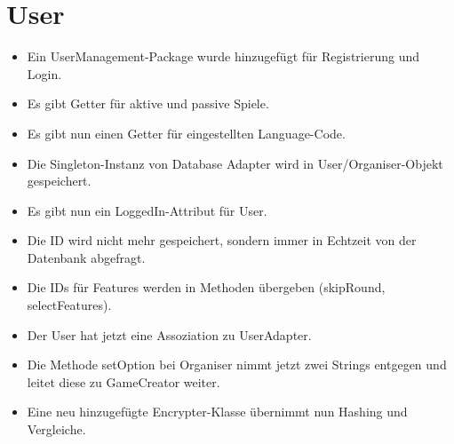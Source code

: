 \documentclass[a4paper]{scrreprt}
\begin{document}
\section{User}
\begin{itemize}
    \item Ein UserManagement-Package wurde hinzugefügt für Registrierung und Login.
    \item Es gibt Getter für aktive und passive Spiele.
    \item Es gibt nun einen Getter für eingestellten Language-Code.
    \item Die Singleton-Instanz von Database Adapter wird in User/Organiser-Objekt gespeichert.
    \item Es gibt nun ein LoggedIn-Attribut für User.
    \item Die ID wird nicht mehr gespeichert, sondern immer in Echtzeit von der Datenbank abgefragt.
    \item Die IDs für Features werden in Methoden übergeben (skipRound, selectFeatures).
    \item Der User hat jetzt eine Assoziation zu UserAdapter.
    \item Die Methode setOption bei Organiser nimmt jetzt zwei Strings entgegen und leitet diese zu GameCreator weiter.
    \item Eine neu hinzugefügte Encrypter-Klasse übernimmt nun Hashing und Vergleiche.
\end{itemize}
\end{document}
